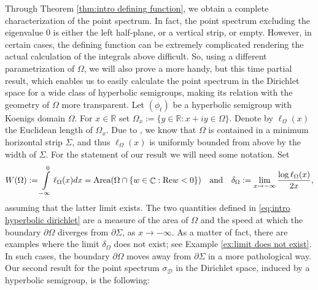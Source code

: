 \documentclass[11pt]{amsart}
\numberwithin{equation}{section}
\theoremstyle{definition}
\DeclareMathOperator{\C}{\mathbb{C}}
\begin{document}
	Through Theorem \ref{thm:intro defining function}, we obtain a complete characterization of the point spectrum. In fact, the point spectrum excluding the eigenvalue $0$ is either the left half-plane, or a vertical strip, or empty. However, in certain cases, the defining function can be extremely complicated rendering the actual calculation of the integrals above difficult. So, using a different parametrization of $\Omega$, we will also prove a more handy, but this time partial result, which enables us to easily calculate the point spectrum in the Dirichlet space for a wide class of hyperbolic semigroups, making its relation with the geometry of $\Omega$ more transparent. Let $(\phi_t)$ be a hyperbolic semigroup with Koenigs domain $\Omega$. For $x\in\mathbb{R}$ set $\Omega_x:=\{y\in\mathbb{R}:x+iy\in\Omega\}$. Denote by $\ell_\Omega(x)$ the Euclidean length of $\Omega_x$. Due to \cite[Theorem 9.3.5]{Booksem}, we know that $\Omega$ is contained in a minimum horizontal strip $\Sigma$, and thus $\ell_\Omega(x)$ is uniformly bounded from above by the width of $\Sigma$. For the statement of our result we will need some notation. Set 
	\begin{equation}\label{eq:intro hyperbolic dirichlet}
		W(\Omega):=\int\limits_{-\infty}^{0}\ell_\Omega(x)dx=\textup{Area}(\Omega\cap\{w\in\C:\mathrm{Re}w<0\}) \quad \textup{and} \quad\delta_\Omega:=\lim\limits_{x\to-\infty}\dfrac{\log\ell_\Omega(x)}{2x},
	\end{equation}
	assuming that the latter limit exists. The two quantities defined in \eqref{eq:intro hyperbolic dirichlet} are a measure of the area of $\Omega$ and the speed at which the boundary $\partial\Omega$ diverges from $\partial \Sigma$, as $x\to-\infty$. As a matter of fact, there are examples where the limit $\delta_\Omega$ does not exist; see Example \ref{ex:limit does not exist}. In such cases, the boundary $\partial\Omega$ moves away from $\partial\Sigma$ in a more pathological way. Our second result for the point spectrum $\sigma_\mathcal{D}$ in the Dirichlet space, induced by a hyperbolic semigroup, is the following:
	
\end{document}
